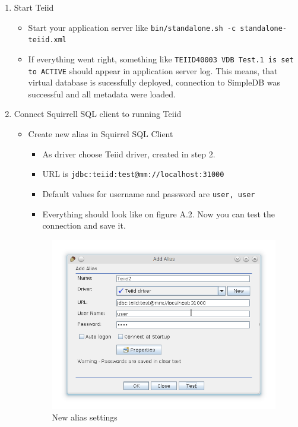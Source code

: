 \documentclass[oneside,12pt]{fithesis2}
\begin{document}
\begin{enumerate}
\begin{enumerate}
\begin{itemize}
 \end{itemize}
\item Start Teiid
\begin{itemize}
 \item Start your application server like \texttt{bin/standalone.sh -c standalone-teiid.xml}
 \item If everything went right, something like \texttt{TEIID40003 VDB Test.1 is set to ACTIVE} should appear in application server log. This means, that virtual database is sucessfully deployed, connection to SimpleDB was successful and all metadata were loaded.
\end{itemize}
\item Connect Squirrell SQL client to running Teiid
\begin{itemize}
 \item Create new alias in Squirrel SQL Client
 \begin{itemize}
  \item As driver choose Teiid driver, created in step 2.
  \item URL is \texttt{jdbc:teiid:test@mm://localhost:31000}
  \item Default values for username and password are \texttt{user, user}
  \item Everything should look like on figure A.2. Now you can test the connection and save it. 
 \end{itemize}
 \begin{figure}[h]
 \centering
 \includegraphics[scale=0.8]{newAlias}
 \caption{New alias settings}
 \end{figure}
\end{itemize}

\end{enumerate}
\end{enumerate}
\end{document}
